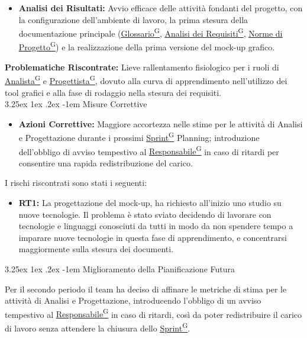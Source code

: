 \documentclass[a4paper,12pt]{article}
\makeatletter
\renewcommand\paragraph{\@startsection{paragraph}{5}{\z@}%
  {3.25ex \@plus1ex \@minus.2ex}%
  {-1em}%
  {\normalfont\normalsize\bfseries}}
\providecommand{\glslink}[2]{\href{https://alittlebyte-19.github.io/Documentazione/glossario.html\#gls-#1}{\underline{#2}\textsuperscript{\scriptsize G}}}
\makeatother
\begin{document}
\begin{itemize}
    \item \textbf{Analisi dei Risultati:} Avvio efficace delle attività fondanti del progetto, con la configurazione dell'ambiente di lavoro, la prima stesura della documentazione principale (\glslink{glossario}{Glossario}, \glslink{analisi-dei-requisiti-adr}{Analisi dei Requisiti}, \glslink{norme-di-progetto}{Norme di Progetto}) e la realizzazione della prima versione del mock-up grafico.
\end{itemize}
\textbf{Problematiche Riscontrate:} Lieve rallentamento fisiologico per i ruoli di \glslink{analista}{Analista} e \glslink{progettista}{Progettista}, dovuto alla curva di apprendimento nell'utilizzo dei tool grafici e alla fase di rodaggio nella stesura dei requisiti.\\


\paragraph{Misure Correttive}

\begin{itemize}
    \item \textbf{Azioni Correttive:} Maggiore accortezza nelle stime per le attività di Analisi e Progettazione durante i prossimi \glslink{sprint}{Sprint} Planning; introduzione dell'obbligo di avviso tempestivo al \glslink{responsabile}{Responsabile} in caso di ritardi per consentire una rapida redistribuzione del carico.
\end{itemize}
I rischi riscontrati sono stati i seguenti:
\begin{itemize}
    \item \textbf{RT1:} La progettazione del mock-up, ha richiesto all'inizio uno studio su nuove tecnologie. Il problema è stato sviato decidendo di lavorare con tecnologie e linguaggi conosciuti da tutti in modo da non spendere tempo a imparare nuove tecnologie in questa fase di apprendimento, e concentrarsi maggiormente sulla stesura dei documenti. 
\end{itemize}


\paragraph{Miglioramento della Pianificazione Futura}

Per il secondo periodo il team ha deciso di affinare le metriche di stima per le attività di Analisi e Progettazione, introducendo l'obbligo di un avviso tempestivo al \glslink{responsabile}{Responsabile} in caso di ritardi, così da poter redistribuire il carico di lavoro senza attendere la chiusura dello \glslink{sprint}{Sprint}.
\end{document}
